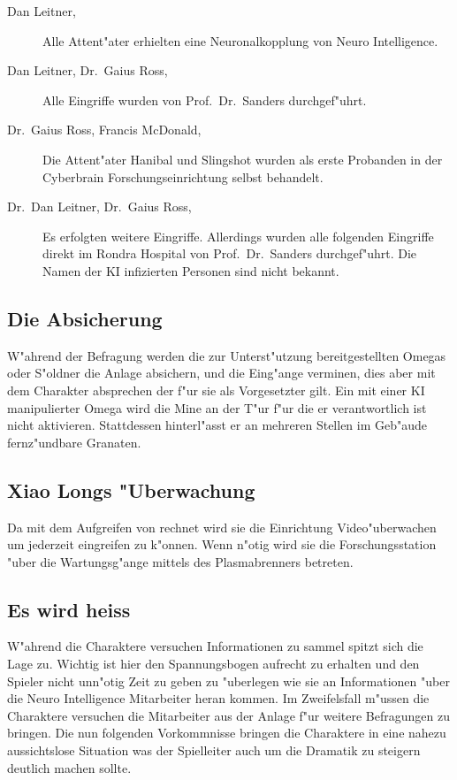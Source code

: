 \begin{description}
	\item[Dan Leitner, \ml{}] Alle Attent"ater erhielten eine Neuronalkopplung von Neuro Intelligence.
	\item[Dan Leitner, Dr.~Gaius Ross, \ml{}] Alle Eingriffe wurden von Prof.~Dr.~Sanders durchgef"uhrt.
	\item[Dr.~Gaius Ross, Francis McDonald, \ml{}] Die Attent"ater Hanibal und Slingshot wurden als erste Probanden in der Cyberbrain 			Forschungseinrichtung selbst behandelt.	
	\item[Dr.~Dan Leitner, Dr.~Gaius Ross, \ml{}] Es erfolgten weitere Eingriffe. Allerdings wurden alle folgenden Eingriffe direkt im 			Rondra Hospital von Prof.~Dr.~Sanders durchgef"uhrt. Die Namen der KI infizierten Personen sind nicht bekannt.
\end{description}

\subsection{Die Absicherung} 
W"ahrend der Befragung werden die zur Unterst"utzung bereitgestellten Omegas oder S"oldner die Anlage absichern, und die Eing"ange verminen, dies aber mit dem Charakter absprechen der f"ur sie als Vorgesetzter gilt. Ein mit einer KI manipulierter Omega wird die Mine an der T"ur f"ur die er verantwortlich ist nicht aktivieren. Stattdessen hinterl"asst er an mehreren Stellen im Geb"aude fernz"undbare Granaten.

\subsection{Xiao Longs "Uberwachung}  
Da \xl{} mit dem Aufgreifen von \ml{} rechnet wird sie die Einrichtung Video"uberwachen um jederzeit eingreifen zu k"onnen. Wenn n"otig wird sie die Forschungsstation "uber die Wartungsg"ange mittels des Plasmabrenners betreten.

\subsection{Es wird heiss} 
W"ahrend die Charaktere versuchen Informationen zu sammel spitzt sich die Lage zu. Wichtig ist hier den Spannungsbogen aufrecht zu erhalten und den Spieler nicht unn"otig Zeit zu geben zu "uberlegen wie sie an Informationen "uber die Neuro Intelligence Mitarbeiter heran kommen. Im Zweifelsfall m"ussen die Charaktere versuchen die Mitarbeiter aus der Anlage f"ur weitere Befragungen zu bringen. Die nun folgenden Vorkommnisse bringen die Charaktere in eine nahezu aussichtslose Situation was der Spielleiter auch um die Dramatik zu steigern deutlich machen sollte.

